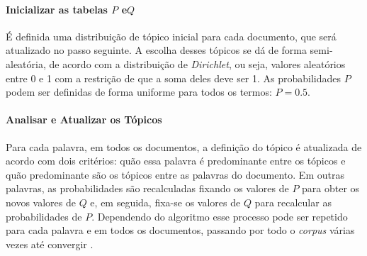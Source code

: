 \paragraph{Inicializar as tabelas \(P\) e\(Q\)}
É definida uma distribuição de tópico inicial para cada documento, que será atualizado no passo seguinte. A escolha desses tópicos se dá de forma semi-aleatória, de acordo com a distribuição de \textit{Dirichlet}, ou seja, valores aleatórios entre 0 e 1 com a restrição de que a soma deles deve ser 1. As probabilidades \(P\) podem ser definidas de forma uniforme para todos os termos: \(P=0.5\).

\paragraph{Analisar e Atualizar os Tópicos}
Para cada palavra, em todos os documentos, a definição do tópico é atualizada de acordo com dois critérios: quão essa palavra é predominante  entre os tópicos e quão predominante são os tópicos entre as palavras do documento. Em outras palavras, as probabilidades são recalculadas fixando os valores de \(P\) para obter os novos valores de \(Q\) e, em seguida, fixa-se os valores de \(Q\) para recalcular as probabilidades de \(P\). Dependendo do algoritmo esse processo pode ser repetido para cada palavra e em todos os documentos, passando por todo o \textit{corpus} várias vezes até convergir \cite{annalyn}.
